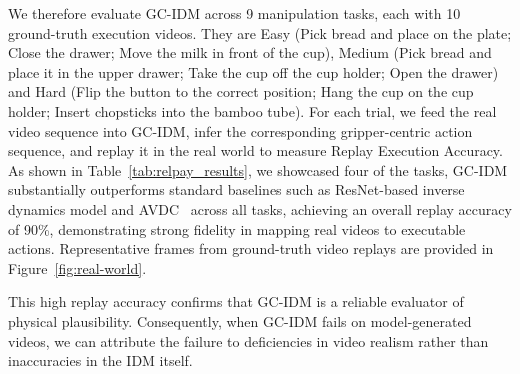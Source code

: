 We therefore evaluate GC-IDM across 9 manipulation tasks, each with 10 ground-truth execution videos. They are Easy (Pick bread and place on the plate; Close the drawer; Move the milk in front of the cup), Medium (Pick bread and place it in the upper drawer; Take the cup off the cup holder; Open the drawer) and Hard (Flip the button to the correct position; Hang the cup on the cup holder; Insert chopsticks into the bamboo tube). For each trial, we feed the real video sequence into GC-IDM, infer the corresponding gripper-centric action sequence, and replay it in the real world to measure Replay Execution Accuracy. As shown in Table~\ref{tab:relpay_results}, we showcased four of the tasks, GC-IDM substantially outperforms standard baselines such as ResNet-based inverse dynamics model and AVDC~\cite{Ko2023Learning} across all tasks, achieving an overall replay accuracy of 90\%, demonstrating strong fidelity in mapping real videos to executable actions. Representative frames from ground-truth video replays are provided in Figure~\ref{fig:real-world}.

This high replay accuracy confirms that GC-IDM is a reliable evaluator of physical plausibility. Consequently, when GC-IDM fails on model-generated videos, we can attribute the failure to deficiencies in video realism rather than inaccuracies in the IDM itself.

\begin{table}[h!]
\centering
\caption{\textbf{Comparison of Success Rate (\%) on various tasks across different models on ground-truth video replay.}}
\label{tab:relpay_results}
\end{table}

